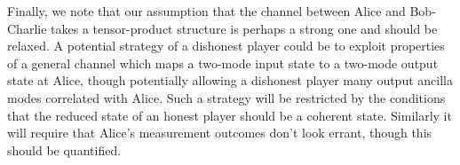 Finally, we note that our assumption that the channel between Alice and Bob-Charlie takes a tensor-product structure is perhaps a strong one and should be relaxed. A potential strategy of a dishonest player could be to exploit properties of a general channel which maps a two-mode input state to a two-mode output state at Alice, though potentially allowing a dishonest player many output ancilla modes correlated with Alice. Such a strategy will be restricted by the conditions that the reduced state of an honest player should be a coherent state. Similarly it will require that Alice's measurement outcomes don't look errant, though this should be quantified.








